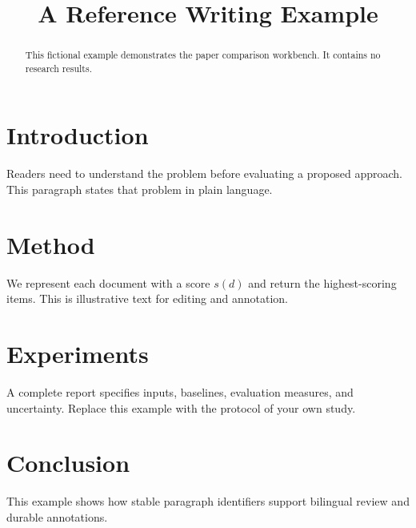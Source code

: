 \title{A Reference Writing Example}

\begin{abstract}This fictional example demonstrates the paper comparison workbench. It contains no research results.\end{abstract}

\section{Introduction}

Readers need to understand the problem before evaluating a proposed approach. This paragraph states that problem in plain language.

\section{Method}

We represent each document with a score $s(d)$ and return the highest-scoring items. This is illustrative text for editing and annotation.

\section{Experiments}

A complete report specifies inputs, baselines, evaluation measures, and uncertainty. Replace this example with the protocol of your own study.

\section{Conclusion}

This example shows how stable paragraph identifiers support bilingual review and durable annotations.
